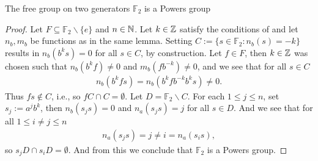 \begin{example}
The free group on two generators $\mathbb{F}_2$ is a Powers group
\begin{proof}
Let $F \subseteq \mathbb{F}_2 \backslash \{e\}$ and $n \in \mathbb{N}$. Let $k \in \mathbb{Z}$ satisfy the conditions of  and let $n_b, m_b$ be functions as in the same lemma. Setting $C:= \{s \in \mathbb{F}_2 \colon n_b(s)=-k\}$ results in $n_b(b^k s)=0$ for all $s \in C$, by construction. Let $f \in F$, then $k \in \mathbb{Z}$ was chosen such that $n_b(b^k f)\neq 0$ and $m_b(fb^{-k}) \neq 0$, and we see that for all $s \in C$
\begin{align*}
n_b(b^kfs)=n_b(b^k f b^{-k}b^k s) \neq 0.
\end{align*} 
Thus $fs \not \in C$, i.e., so $f C \cap C = \emptyset$. Let $D=\mathbb{F}_2 \backslash C$. For each $1 \leq j \leq n$, set $s_j:=a^jb^k$, then $n_b(s_j s)=0$ and $n_a(s_j s)=j$ for all $s \in D$. And we see that for all $1 \leq i \neq j \leq n$
\begin{align*}
n_a(s_j s) = j \neq i =n_a(s_i s),
\end{align*}
so $s_j D \cap s_i D = \emptyset$. And from this we conclude that $\mathbb{F}_2$ is a Powers group.
\end{proof}
\end{example}

